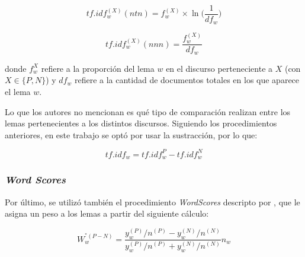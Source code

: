 \begin{equation}
\label{equation-tfidf-ntn}
    tf.idf_{w}^{(X)}(ntn) = f_{w}^{(X)} \times \ln\bigg({\frac{1}{df_{w}}}\bigg)
\end{equation}

\begin{equation}
\label{equation-tfidf-nnn}
    tf.idf_{w}^{(X)}(nnn) = \frac{f_{w}^{(X)}}{df_{w}}
\end{equation}

donde $f_{w}^{X}$ refiere a la proporci\'on del lema $w$ en el discurso
perteneciente a $X$ (con $X \in \lbrace P,N \rbrace$) y $df_w$ refiere a la
cantidad de documentos totales en los que aparece el lema $w$.
\par
Lo que los autores no mencionan es qu\'e tipo de comparaci\'on realizan entre los
lemas pertenecientes a los distintos discursos. Siguiendo los procedimientos
anteriores, en este trabajo se opt\'o por usar la sustracci\'on, por lo que:

\begin{equation*}
    tf.idf_{w} = tf.idf_{w}^{P}-tf.idf_{w}^{N}
\end{equation*}

\subsubsection{\textit{Word Scores}}
\label{subsubsec-methods-wordscores}
Por \'ultimo, se utiliz\'o tambi\'en el procedimiento \textit{WordScores} descripto por
\cite{laver2003extracting}, que le asigna un peso a los lemas a partir
del siguiente c\'alculo:

\begin{equation*}
    W_{w}^{^*(P-N)} = \frac{y_{w}^{(P)}/n^{(P)}-y_{w}^{(N)}/n^{(N)}}{y_{w}^{(P)}/n^{(P)}+y_{w}^{(N)}/n^{(N)}}n_{w}
\end{equation*}
